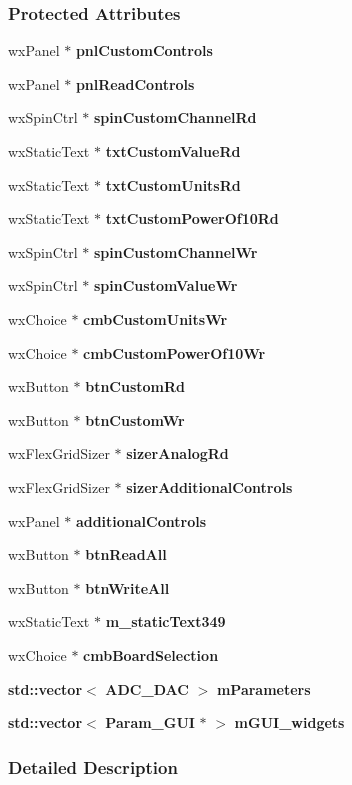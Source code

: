\subsubsection*{Protected Attributes}
\begin{DoxyCompactItemize}
\item 
wx\+Panel $\ast$ {\bf pnl\+Custom\+Controls}
\item 
wx\+Panel $\ast$ {\bf pnl\+Read\+Controls}
\item 
wx\+Spin\+Ctrl $\ast$ {\bf spin\+Custom\+Channel\+Rd}
\item 
wx\+Static\+Text $\ast$ {\bf txt\+Custom\+Value\+Rd}
\item 
wx\+Static\+Text $\ast$ {\bf txt\+Custom\+Units\+Rd}
\item 
wx\+Static\+Text $\ast$ {\bf txt\+Custom\+Power\+Of10\+Rd}
\item 
wx\+Spin\+Ctrl $\ast$ {\bf spin\+Custom\+Channel\+Wr}
\item 
wx\+Spin\+Ctrl $\ast$ {\bf spin\+Custom\+Value\+Wr}
\item 
wx\+Choice $\ast$ {\bf cmb\+Custom\+Units\+Wr}
\item 
wx\+Choice $\ast$ {\bf cmb\+Custom\+Power\+Of10\+Wr}
\item 
wx\+Button $\ast$ {\bf btn\+Custom\+Rd}
\item 
wx\+Button $\ast$ {\bf btn\+Custom\+Wr}
\item 
wx\+Flex\+Grid\+Sizer $\ast$ {\bf sizer\+Analog\+Rd}
\item 
wx\+Flex\+Grid\+Sizer $\ast$ {\bf sizer\+Additional\+Controls}
\item 
wx\+Panel $\ast$ {\bf additional\+Controls}
\item 
wx\+Button $\ast$ {\bf btn\+Read\+All}
\item 
wx\+Button $\ast$ {\bf btn\+Write\+All}
\item 
wx\+Static\+Text $\ast$ {\bf m\+\_\+static\+Text349}
\item 
wx\+Choice $\ast$ {\bf cmb\+Board\+Selection}
\item 
{\bf std\+::vector}$<$ {\bf A\+D\+C\+\_\+\+D\+AC} $>$ {\bf m\+Parameters}
\item 
{\bf std\+::vector}$<$ {\bf Param\+\_\+\+G\+UI} $\ast$ $>$ {\bf m\+G\+U\+I\+\_\+widgets}
\end{DoxyCompactItemize}


\subsubsection{Detailed Description}


